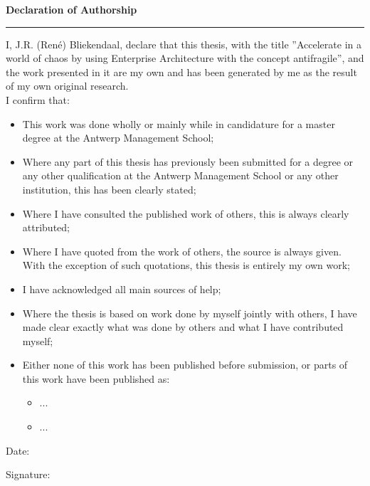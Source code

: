 
\thispagestyle{plain}
\vspace*{\fill}
\LARGE
\noindent \textbf{Declaration of Authorship}
\hrule
\normalsize
\bigskip
\noindent
I, J.R. (René) Bliekendaal, declare that this thesis, with the title ''Accelerate in a world of chaos by using Enterprise Architecture with the concept antifragile'', and the work presented in it are my own and has been generated by me as the result of my own original research.\\

\noindent I confirm that:
\begin{itemize}
	\item{This work was done wholly or mainly while in candidature for a master degree at the Antwerp Management School;}
	\item{Where any part of this thesis has previously been submitted for a degree or any other qualification at the Antwerp Management School or any other institution, this has been clearly stated;}
	\item{Where I have consulted the published work of others, this is always clearly attributed;}
	\item{Where I have quoted from the work of others, the source is always given. With the exception of such quotations, this thesis is entirely my own work;}
	\item{I have acknowledged all main sources of help;}
	\item{Where the thesis is based on work done by myself jointly with others, I have made clear exactly what was done by others and what I have contributed myself;}
	\item{Either none of this work has been published before submission, or parts of this work have been published as:}
	\begin{itemize}
		\item{...}	
		\item{...}
	\end{itemize}
\end{itemize}
\bigskip

\noindent
Date: \makebox[2in]{\hrulefill}\\
\bigskip

\noindent Signature: \makebox[2in]{\hrulefill}\\
\vspace*{\fill}
